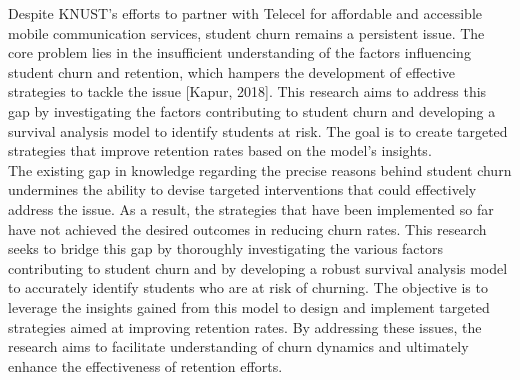 \documentclass[doublespacing,12pt]{report}
\begin{document}
Despite KNUST's efforts to partner with Telecel for affordable and accessible mobile communication services, student churn remains a persistent issue. The core problem lies in the insufficient understanding of the factors influencing student churn and retention, which hampers the development of effective strategies to tackle the issue [Kapur, 2018]. This research aims to address this gap by investigating the factors contributing to student churn and developing a survival analysis model to identify students at risk. The goal is to create targeted strategies that improve retention rates based on the model's insights.\\
The existing gap in knowledge regarding the precise reasons behind student churn undermines the ability to devise targeted interventions that could effectively address the issue. As a result, the strategies that have been implemented so far have not achieved the desired outcomes in reducing churn rates. This research seeks to bridge this gap by thoroughly investigating the various factors contributing to student churn and by developing a robust survival analysis model to accurately identify students who are at risk of churning. The objective is to leverage the insights gained from this model to design and implement targeted strategies aimed at improving retention rates. By addressing these issues, the research aims to facilitate understanding of churn dynamics and ultimately enhance the effectiveness of retention efforts.
\end{document}
